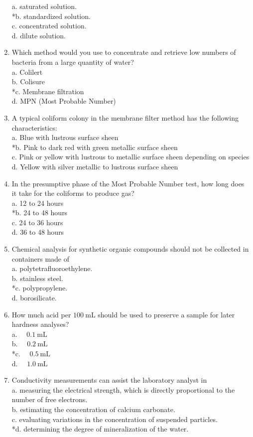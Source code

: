 \begin{enumerate}[1.]
a. saturated solution.\\
*b. standardized solution.\\
c. concentrated solution.\\
d. dilute solution.\\

  \item Which method would you use to concentrate and retrieve low numbers of bacteria from a large quantity of water?\\
a. Colilert\\
b. Colisure\\
*c. Membrane filtration\\
d. MPN (Most Probable Number)\\
  \item A typical coliform colony in the membrane filter method has the following characteristics:\\
a. Blue with lustrous surface sheen\\
*b. Pink to dark red with green metallic surface sheen\\
c. Pink or yellow with lustrous to metallic surface sheen depending on species\\
d. Yellow with silver metallic to lustrous surface sheen\\
  \item In the presumptive phase of the Most Probable Number test, how long does it take for the coliforms to produce gas?\\
a. 12 to 24 hours\\
*b. 24 to 48 hours\\
c. 24 to 36 hours\\
d. 36 to 48 hours\\

  \item Chemical analysis for synthetic organic compounds should not be collected in containers made of\\
a. polytetrafluoroethylene.\\
b. stainless steel.\\
*c. polypropylene.\\
d. borosilicate.\\
  \item How much acid per $100 \mathrm{~mL}$ should be used to preserve a sample for later hardness analyses?\\
a. $\quad 0.1 \mathrm{~mL}$\\
b. $\quad 0.2 \mathrm{~mL}$\\
*c. $\quad 0.5 \mathrm{~mL}$\\
d. $\quad 1.0 \mathrm{~mL}$\\
  \item Conductivity measurements can assist the laboratory analyst in\\
a. measuring the electrical strength, which is directly proportional to the number of free electrons.\\
b. estimating the concentration of calcium carbonate.\\
c. evaluating variations in the concentration of suspended particles.\\
*d. determining the degree of mineralization of the water. 


\end{enumerate}

